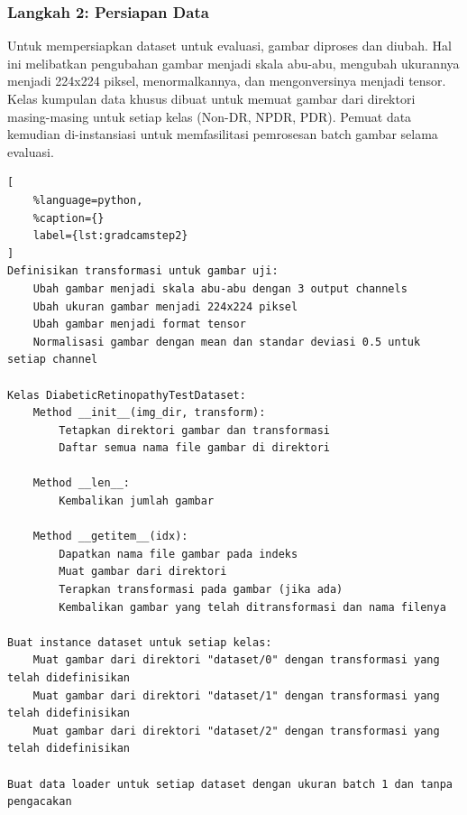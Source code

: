 \subsubsection{Langkah 2: Persiapan Data}
Untuk mempersiapkan dataset untuk evaluasi, gambar diproses dan diubah. 
Hal ini melibatkan pengubahan gambar menjadi skala abu-abu, mengubah ukurannya menjadi 224x224 piksel, menormalkannya, dan mengonversinya menjadi tensor. 
Kelas kumpulan data khusus dibuat untuk memuat gambar dari direktori masing-masing untuk setiap kelas (Non-DR, NPDR, PDR). 
Pemuat data kemudian di-instansiasi untuk memfasilitasi pemrosesan batch gambar selama evaluasi.

\begin{lstlisting}[
	%language=python,
	%caption={}
	label={lst:gradcamstep2}
]
Definisikan transformasi untuk gambar uji:
    Ubah gambar menjadi skala abu-abu dengan 3 output channels
    Ubah ukuran gambar menjadi 224x224 piksel
    Ubah gambar menjadi format tensor
    Normalisasi gambar dengan mean dan standar deviasi 0.5 untuk setiap channel

Kelas DiabeticRetinopathyTestDataset:
    Method __init__(img_dir, transform):
        Tetapkan direktori gambar dan transformasi
        Daftar semua nama file gambar di direktori

    Method __len__:
        Kembalikan jumlah gambar

    Method __getitem__(idx):
        Dapatkan nama file gambar pada indeks
        Muat gambar dari direktori
        Terapkan transformasi pada gambar (jika ada)
        Kembalikan gambar yang telah ditransformasi dan nama filenya

Buat instance dataset untuk setiap kelas:
    Muat gambar dari direktori "dataset/0" dengan transformasi yang telah didefinisikan
    Muat gambar dari direktori "dataset/1" dengan transformasi yang telah didefinisikan
    Muat gambar dari direktori "dataset/2" dengan transformasi yang telah didefinisikan

Buat data loader untuk setiap dataset dengan ukuran batch 1 dan tanpa pengacakan
\end{lstlisting}
